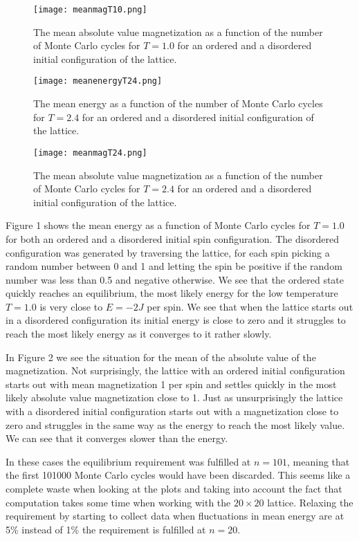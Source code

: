 \documentclass[english, 12pt]{article}
\begin{document}
\begin{figure}[hbt!]
\centering
\texttt{[image: meanmagT10.png]}
\caption{The mean absolute value magnetization as a function of the number of Monte Carlo cycles for $T=1.0$ for an ordered and a disordered initial configuration of the lattice.}
\end{figure}

\begin{figure}[hbt!]
\centering
\texttt{[image: meanenergyT24.png]}
\caption{The mean energy as a function of the number of Monte Carlo cycles for $T=2.4$ for an ordered and a disordered initial configuration of the lattice.}
\end{figure}

\begin{figure}[hbt!]
\centering
\texttt{[image: meanmagT24.png]}
\caption{The mean absolute value magnetization as a function of the number of Monte Carlo cycles for $T=2.4$ for an ordered and a disordered initial configuration of the lattice.}
\end{figure}

Figure 1 shows the mean energy as a function of Monte Carlo cycles for $T=1.0$ for both an ordered and a disordered initial spin configuration. The disordered configuration was generated by traversing the lattice, for each spin picking a random number between 0 and 1 and letting the spin be positive if the random number was less than 0.5 and negative otherwise. We see that the ordered state quickly reaches an equilibrium, the most likely energy for the low temperature $T=1.0$ is very close to $E = -2J$ per spin. We see that when the lattice starts out in a disordered configuration its initial energy is close to zero and it struggles to reach the most likely energy as it converges to it rather slowly.

In Figure 2 we see the situation for the mean of the absolute value of the magnetization. Not surprisingly, the lattice with an ordered initial configuration starts out with mean magnetization 1 per spin and settles quickly in the most likely absolute value magnetization close to 1. Just as unsurprisingly the lattice with a disordered initial configuration starts out with a magnetization close to zero and struggles in the same way as the energy to reach the most likely value. We can see that it converges slower than the energy.

In these cases the equilibrium requirement was fulfilled at $n=101$, meaning that the first 101000 Monte Carlo cycles would have been discarded. This seems like a complete waste when looking at the plots and taking into account the fact that computation takes some time when working with the $20\times20$ lattice. Relaxing the requirement by starting to collect data when fluctuations in mean energy are at 5\% instead of 1\% the requirement is fulfilled at $n=20$. 
\end{document}
